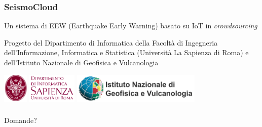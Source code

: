 \documentclass[10pt]{beamer}
\begin{document}
	\begin{frame}
		\frametitle{SeismoCloud}
		Un sistema di EEW (Earthquake Early Warning) basato su IoT in \textit{crowdsourcing}
		
		Progetto del Dipartimento di Informatica della Facoltà di Ingegneria dell'Informazione, Informatica e Statistica (Università La Sapienza di Roma) e dell'Istituto Nazionale di Geofisica e Vulcanologia
		
		\centering
		\includegraphics[keepaspectratio=true,height=40pt]{dipartimentologo}
		\includegraphics[keepaspectratio=true,height=40pt]{dipartimento}
			\hspace{1em}
		\includegraphics[keepaspectratio=true,height=40pt]{ingv}
	\end{frame}
	
	
	
	

	\begin{frame}
		\frametitle{\hfill}
		
		\LARGE Domande?		
		
	\end{frame}
	
\end{document}
